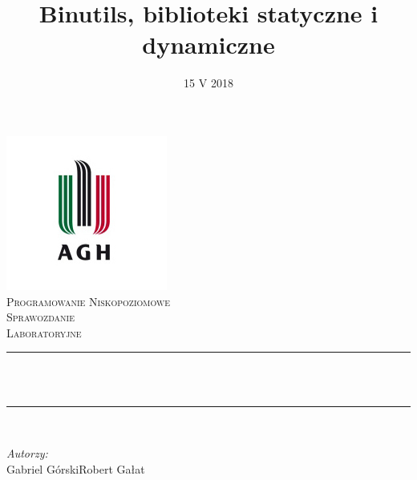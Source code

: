 \documentclass[12pt]{article}
\title{Binutils, biblioteki statyczne i dynamiczne} %
\author{} %
\date{15 V 2018} %
\begin{document}

\begin{titlepage}
  \centering \vspace*{0.5 cm} \includegraphics[scale = 0.75]{agh.jpg}\\[1.0
  cm] %
  \textsc{\Large Programowanie Niskopoziomowe}\\[0.5 cm] %
  \textsc{\large Sprawozdanie\\Laboratoryjne}\\[0.5 cm] %
  \rule{\linewidth}{0.2 mm} \\[0.4 cm]
  { \huge \bfseries \thetitle}\\
  \rule{\linewidth}{0.2 mm} \\[1.5 cm]

  \begin{minipage}{0.4\textwidth}
    \begin{flushleft} \large \vspace{3cm}
      \emph{Autorzy:}\\
      Gabriel Górski\newline Robert Gałat %
    \end{flushleft}
  \end{minipage}~
  \begin{minipage}{0.4\textwidth}
    \begin{flushright} \large
    \end{flushright}
  \end{minipage}\\[1 cm]
  {\large \thedate}
  \pagebreak

\end{titlepage}

\end{document}

